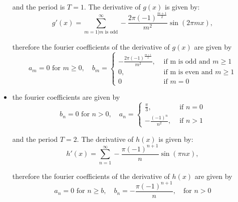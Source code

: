 \documentclass[11pt]{article}
\begin{document}
\begin{solution}
\begin{itemize}
and the period is $T = 1$. The derivative of $g(x)$ is given by:
$$
g'(x) = \sum_{m=1|m \text{ is odd}}^{\infty} -\frac{2\pi (-1)^{\frac{m+1}{2}}}{m^2}\sin(2\pi m x),
$$

therefore the fourier coefficients of the derivative of $g(x)$ are given by 
$$
a_m = 0 \text{ for } m \geq 0, \quad b_m = \begin{cases}-\frac{2\pi (-1)^{\frac{m+1}{2}}}{m^2}, & \text { if m is odd and }m \geq 1 \\ 0, & \text{ if m is even and } m \geq 1\\ 0 & \text{ if } m = 0  \end{cases} 
$$
\item 
the fourier coefficients are given by 
$$
b_n = 0 \text{ for } n >0, \quad a_n = \begin{cases}\frac{\pi}{3}, & \text { if }n = 0 \\ -\frac{(-1)^n}{n^2}, & \text{ if } n > 1 \end{cases} 
$$

and the period $T = 2$. The derivative of $h(x)$ is given by:
$$
h'(x) =\sum_{n=1}^{\infty} -\frac{\pi(-1)^{n+1}}{n}\sin(\pi n x),
$$

therefore the fourier coefficients of the derivative of $h(x)$ are given by 
$$
a_n = 0 \text{ for } n \geq b, \quad b_n = -\frac{\pi(-1)^{n+1}}{n},\quad \text{for }n > 0
$$
\end{itemize}
\end{solution}
\end{document}
